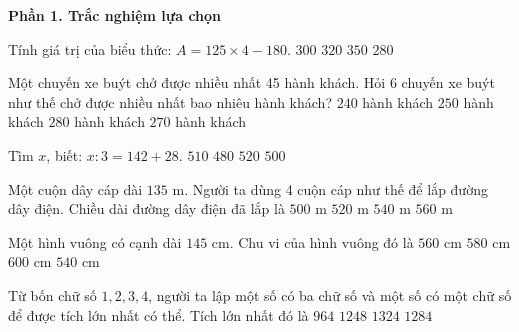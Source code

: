 \textbf{Phần 1. Trắc nghiệm lựa chọn}

\begin{ex} %
Tính giá trị của biểu thức: $A = 125 \times 4 - 180$.
\choice
{$300$}
{\True $320$}
{$350$}
{$280$}
\end{ex}

\begin{ex} %
Một chuyến xe buýt chở được nhiều nhất 45 hành khách. Hỏi 6 chuyến xe buýt như thế chở được nhiều nhất bao nhiêu hành khách?
\choice
{$240$ hành khách}
{$250$ hành khách}
{$280$ hành khách}
{\True $270$ hành khách}
\end{ex}

\begin{ex} %
Tìm $x$, biết: $x : 3 = 142 + 28$.
\choice
{\True $510$}
{$480$}
{$520$}
{$500$}
\end{ex}

\begin{ex} %
Một cuộn dây cáp dài $135\text{ m}$. Người ta dùng 4 cuộn cáp như thế để lắp đường dây điện. Chiều dài đường dây điện đã lắp là
\choice
{$500\text{ m}$}
{$520\text{ m}$}
{\True $540\text{ m}$}
{$560\text{ m}$}
\end{ex}

\begin{ex} %
Một hình vuông có cạnh dài $145\text{ cm}$. Chu vi của hình vuông đó là
\choice
{$560\text{ cm}$}
{\True $580\text{ cm}$}
{$600\text{ cm}$}
{$540\text{ cm}$}
\end{ex}

\begin{ex} %
Từ bốn chữ số $1, 2, 3, 4$, người ta lập một số có ba chữ số và một số có một chữ số để được tích lớn nhất có thể. Tích lớn nhất đó là
\choice
{$964$}
{$1248$}
{$1324$}
{\True $1284$}
\end{ex}

